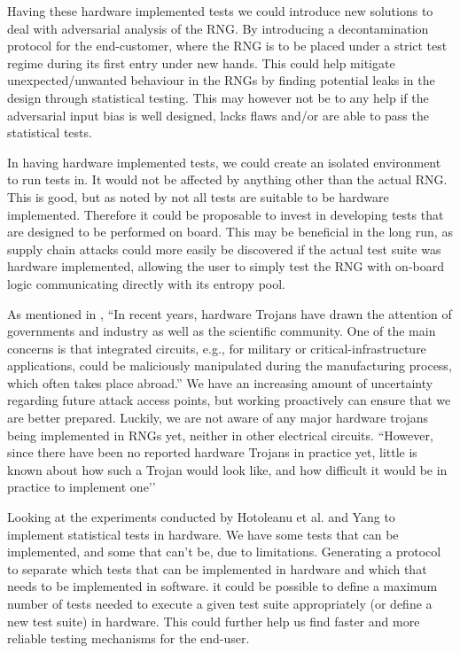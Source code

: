 \documentclass[]{final_report}
\begin{document}
\par{Having these hardware implemented tests we could introduce new solutions to deal with adversarial analysis of the RNG. By introducing a decontamination protocol for the end-customer, where the RNG is to be placed under a strict test regime during its first entry under new hands. This could help mitigate unexpected/unwanted behaviour in the RNGs by finding potential leaks in the design through statistical testing. This may however not be to any help if the adversarial input bias is well designed, lacks flaws and/or are able to pass the statistical tests.}

\par{In having hardware implemented tests, we could create an isolated environment to run tests in. It would not be affected by anything other than the actual RNG. This is good, but as noted by \cite{Hotoleanu:2010} not all tests are suitable to be hardware implemented. Therefore it could be proposable to invest in developing tests that are designed to be performed on board. This may be beneficial in the long run, as supply chain attacks could more easily be discovered if the actual test suite was hardware implemented, allowing the user to simply test the RNG with on-board logic communicating directly with its entropy pool.}

\par{As mentioned in \cite{Becker:2020}, ``In recent years, hardware Trojans have drawn the attention of governments and industry as well as the scientiﬁc community. One of the main concerns is that integrated circuits, e.g., for military or critical-infrastructure applications, could be maliciously manipulated during the manufacturing process, which often takes place abroad.'' We have an increasing amount of uncertainty regarding future attack access points, but working proactively can ensure that we are better prepared. Luckily, we are not aware of any major hardware trojans being implemented in RNGs yet, neither in other electrical circuits. ``However, since there have been no reported hardware Trojans in practice yet, little is known about how such a Trojan would look like, and how diﬃcult it would be in practice to implement one'\cite{Becker:2020}'}

\par{Looking at the experiments conducted by Hotoleanu et al.\cite{Hotoleanu:2010} and Yang\cite{Yang:2016} to implement statistical tests in hardware. We have some tests that can be implemented, and some that can't be, due to limitations. Generating a protocol to separate which tests that can be implemented in hardware and which that needs to be implemented in software. it could be possible to define a maximum number of tests needed to execute a given test suite appropriately (or define a new test suite) in hardware. This could further help us find faster and more reliable testing mechanisms for the end-user.}
\end{document}
